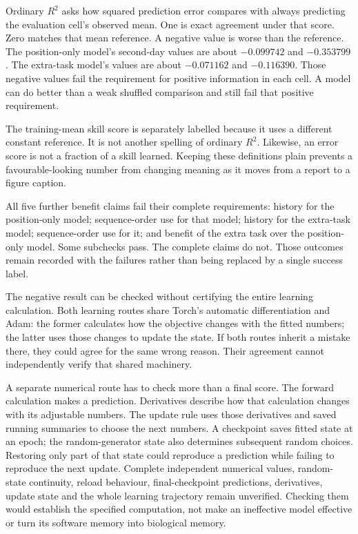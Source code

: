 Ordinary $R^2$ asks how squared prediction error compares with always predicting
the evaluation cell's observed mean. One is exact agreement under that score.
Zero matches that mean reference. A negative value is worse than the reference.
The position-only model's second-day values are about $-0.099742$ and
$-0.353799$. The extra-task model's values are about $-0.071162$ and $-0.116390$.
Those negative values fail the requirement for positive information in each
cell. A model can do better than a weak shuffled comparison and still fail
that positive requirement.

The training-mean skill score is separately labelled because it uses a different
constant reference. It is not another spelling of ordinary $R^2$. Likewise,
an error score is not a fraction of a skill learned. Keeping these definitions
plain prevents a favourable-looking number from changing meaning as it moves
from a report to a figure caption.

All five further benefit claims fail their complete requirements: history for
the position-only model; sequence-order use for that model; history for the
extra-task model; sequence-order use for it; and benefit of the extra task over
the position-only model. Some subchecks pass. The complete claims do not. Those
outcomes remain recorded with the failures rather than being replaced by a
single success label.

The negative result can be checked without certifying the entire learning
calculation. Both learning routes share Torch's automatic differentiation and
Adam: the former calculates how the objective changes with the fitted numbers;
the latter uses those changes to update the state. If both routes inherit a
mistake there, they could agree for the same wrong reason. Their agreement
cannot independently verify that shared machinery.

A separate numerical route has to check more than a final score. The forward
calculation makes a prediction. Derivatives describe how that calculation changes
with its adjustable numbers. The update rule uses those derivatives and saved
running summaries to choose the next numbers. A checkpoint saves fitted state
at an epoch; the random-generator state also determines subsequent random
choices. Restoring only part of that state could reproduce a prediction while
failing to reproduce the next update. Complete independent numerical values,
random-state continuity, reload behaviour, final-checkpoint predictions,
derivatives, update state and the whole learning trajectory remain unverified.
Checking them would establish the specified computation, not make an ineffective
model effective or turn its software memory into biological memory.

